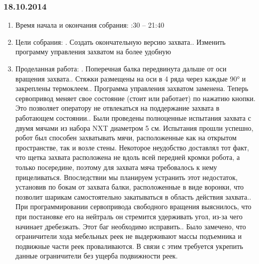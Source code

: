 \documentclass[12pt]{article}
\begin{document}
	      \subsubsection{18.10.2014}
	      \begin{enumerate}
	      	\item Время начала и окончания собрания:
	      	:30 – 21:40
	      	\item Цели собрания:
	      	.	Создать окончательную версию захвата..	Изменить программу управления захватом на более удобную
	      	
	      	\item Проделанная работа:
	      	.	Поперечная балка передвинута дальше от оси вращения захвата..	Стяжки размещены на оси в 4 ряда через каждые 90° и закреплены термоклеем..	Программа управления захватом заменена. Теперь сервопривод меняет свое состояние (стоит или работает) по нажатию кнопки. Это позволяет оператору не отвлекаться на поддержание захвата в работающем состоянии..	Были проведены полноценные испытания захвата с двумя мячами из набора NXT диаметром 5 см. Испытания прошли успешно, робот был способен захватывать мячи, расположенные как на открытом пространстве, так и возле стены. Некоторое неудобство доставлял тот факт, что щетка захвата расположена не вдоль всей передней кромки робота, а только посередине, поэтому для захвата мяча требовалось к нему прицеливаться. Впоследствии мы планируем устранить этот недостаток, установив по бокам от захвата балки, расположенные в виде воронки, что позволит шарикам самостоятельно закатываться в область действия захвата..	При программировании сервопривода свободного вращения выяснилось, что при постановке его на нейтраль он стремится удерживать угол, из-за чего начинает дребезжать. Этот баг необходимо исправить..	Было замечено, что ограничители хода мебельных реек не выдерживают массы подъемника и подвижные части реек проваливаются. В связи с этим требуется укрепить данные ограничители без ущерба подвижности  реек.
	      	

\end{enumerate}
\end{document}
